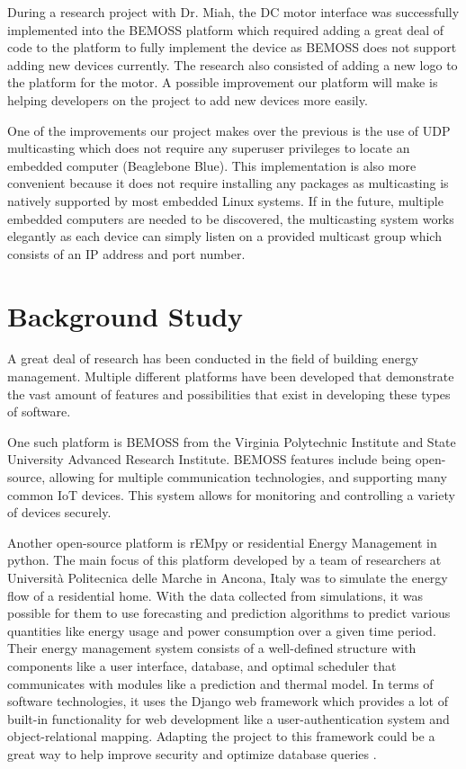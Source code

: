 During a research project with Dr. Miah, the DC motor interface was successfully implemented into the BEMOSS platform which required adding a great deal of code to the platform to fully implement the device as BEMOSS does not support adding new devices currently. The research also consisted of adding a new logo to the platform for the motor. A possible improvement our platform will make is helping developers on the project to add new devices more easily. 

One of the improvements our project makes over the previous is the use of UDP multicasting which does not require any superuser privileges to locate an embedded computer (Beaglebone Blue). This implementation is also more convenient because it does not require installing any packages as multicasting is natively supported by most embedded Linux systems. If in the future, multiple embedded computers are needed to be discovered, the multicasting system works elegantly as each device can simply listen on a provided multicast group which consists of an IP address and port number.

\section{Background Study}
A great deal of research has been conducted in the field of building energy management. Multiple different platforms have been developed that demonstrate the vast amount of features and possibilities that exist in developing these types of software.

One such platform is BEMOSS from the Virginia Polytechnic Institute and State University Advanced Research Institute. BEMOSS features include being open-source, allowing for multiple communication technologies, and supporting many common IoT devices. This system allows for monitoring and controlling a variety of devices securely.

Another open-source platform is rEMpy or residential Energy Management in python. The main focus of this platform developed by a team of researchers at Universit\`{a} Politecnica delle Marche in Ancona, Italy was to simulate the energy flow of a residential home. With the data collected from simulations, it was possible for them to use forecasting and prediction algorithms to predict various quantities like energy usage and power consumption over a given time period. Their energy management system consists of a well-defined structure with components like a user interface, database, and optimal scheduler that communicates with modules like a prediction and thermal model. In terms of software technologies, it uses the Django web framework which provides a lot of built-in functionality for web development like a user-authentication system and object-relational mapping. Adapting the project to this framework could be a great way to help improve security and optimize database queries \cite{fagiani2017}.

